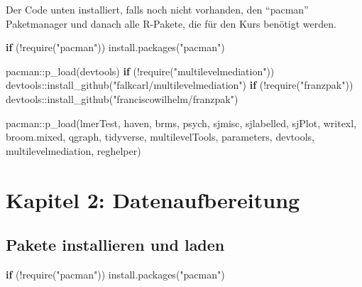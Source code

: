 \documentclass[
  letterpaper,
  DIV=11,
  numbers=noendperiod]{scrreprt}
\newenvironment{Shaded}{\begin{snugshade}}{\end{snugshade}}
\newcommand{\ControlFlowTok}[1]{\textcolor[rgb]{0.00,0.23,0.31}{\textbf{#1}}}
\newcommand{\FunctionTok}[1]{\textcolor[rgb]{0.28,0.35,0.67}{#1}}
\newcommand{\NormalTok}[1]{\textcolor[rgb]{0.00,0.23,0.31}{#1}}
\newcommand{\SpecialCharTok}[1]{\textcolor[rgb]{0.37,0.37,0.37}{#1}}
\newcommand{\StringTok}[1]{\textcolor[rgb]{0.13,0.47,0.30}{#1}}
\begin{document}
Der Code unten installiert, falls noch nicht vorhanden, den ``pacman''
Paketmanager und danach alle R-Pakete, die für den Kurs benötigt werden.

\begin{Shaded}
\begin{Highlighting}[]
\ControlFlowTok{if}\NormalTok{ (}\SpecialCharTok{!}\FunctionTok{require}\NormalTok{(}\StringTok{"pacman"}\NormalTok{)) }\FunctionTok{install.packages}\NormalTok{(}\StringTok{"pacman"}\NormalTok{)}

\NormalTok{pacman}\SpecialCharTok{::}\FunctionTok{p\_load}\NormalTok{(devtools)}
\ControlFlowTok{if}\NormalTok{ (}\SpecialCharTok{!}\FunctionTok{require}\NormalTok{(}\StringTok{"multilevelmediation"}\NormalTok{)) devtools}\SpecialCharTok{::}\FunctionTok{install\_github}\NormalTok{(}\StringTok{"falkcarl/multilevelmediation"}\NormalTok{)}
\ControlFlowTok{if}\NormalTok{ (}\SpecialCharTok{!}\FunctionTok{require}\NormalTok{(}\StringTok{"franzpak"}\NormalTok{)) devtools}\SpecialCharTok{::}\FunctionTok{install\_github}\NormalTok{(}\StringTok{"franciscowilhelm/franzpak"}\NormalTok{)}

\NormalTok{pacman}\SpecialCharTok{::}\FunctionTok{p\_load}\NormalTok{(lmerTest, haven, brms, psych,}
\NormalTok{               sjmisc, sjlabelled, sjPlot, writexl, broom.mixed, qgraph,}
\NormalTok{               tidyverse, multilevelTools, parameters, devtools,}
\NormalTok{               multilevelmediation, reghelper)}
\end{Highlighting}
\end{Shaded}


\chapter{Kapitel 2:
Datenaufbereitung}\label{kapitel-2-datenaufbereitung}

\section{Pakete installieren und
laden}\label{pakete-installieren-und-laden}

\begin{Shaded}
\begin{Highlighting}[]
\ControlFlowTok{if}\NormalTok{ (}\SpecialCharTok{!}\FunctionTok{require}\NormalTok{(}\StringTok{"pacman"}\NormalTok{)) }\FunctionTok{install.packages}\NormalTok{(}\StringTok{"pacman"}\NormalTok{)}
\end{Highlighting}
\end{Shaded}
\end{document}
